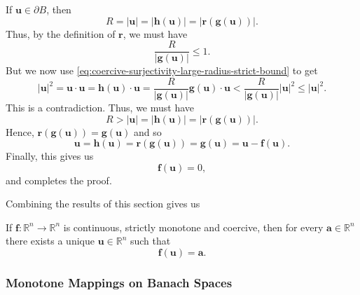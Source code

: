 \begin{Proof}
If $\bm{u}\in\partial B$, then
\begin{equation}\label{eq:coercive-surjectivity-boundary-fixed-point-norms}
R=|\bm{u}|=|\bm{h}(\bm{u})|=|\bm{r}(\bm{g}(\bm{u}))|.
\end{equation}
Thus, by the definition of $\bm{r}$, we must have
\begin{equation}\label{eq:coercive-surjectivity-boundary-radius-ratio}
\dfrac{R}{|\bm{g}(\bm{u})|}\leq1.
\end{equation}
But we now use \eqref{eq:coercive-surjectivity-large-radius-strict-bound} to get
\begin{equation}\label{eq:coercive-surjectivity-boundary-contradiction}
|\bm{u}|^2=\bm{u}\cdot\bm{u}=\bm{h}(\bm{u})\cdot\bm{u}=\dfrac{R}{|\bm{g}(\bm{u})|}\bm{g}(\bm{u})\cdot\bm{u}<\dfrac{R}{|\bm{g}(\bm{u})|}|\bm{u}|^2\leq|\bm{u}|^2.
\end{equation}
This is a contradiction. Thus, we must have
\begin{equation}\label{eq:coercive-surjectivity-interior-fixed-point-norms}
R>|\bm{u}|=|\bm{h}(\bm{u})|=|\bm{r}(\bm{g}(\bm{u}))|.
\end{equation}
Hence, $\bm{r}(\bm{g}(\bm{u}))=\bm{g}(\bm{u})$ and so
\begin{equation}\label{eq:coercive-surjectivity-interior-retraction-identity}
\bm{u}=\bm{h}(\bm{u})=\bm{r}(\bm{g}(\bm{u}))=\bm{g}(\bm{u})=\bm{u}-\bm{f}(\bm{u}).
\end{equation}
Finally, this gives us
\begin{equation}\label{eq:coercive-surjectivity-zero-equation-conclusion}
\bm{f}(\bm{u})=0,
\end{equation}
and completes the proof.
\end{Proof}
\endgroup

Combining the results of this section gives us

\begin{Corollary}
\label{cor:finite-dimensional-coercive-strict-monotone-bijection}
If $\bm{f}:\mathbb{R}^n\to\mathbb{R}^n$ is continuous, strictly monotone and coercive, then for every $\bm{a}\in\mathbb{R}^n$ there exists a unique $\bm{u}\in\mathbb{R}^n$ such that\[\bm{f}(\bm{u})=\bm{a}.\]
\end{Corollary}

\subsubsection{Monotone Mappings on Banach Spaces}\label{subsec:monotone-banach-mappings}

